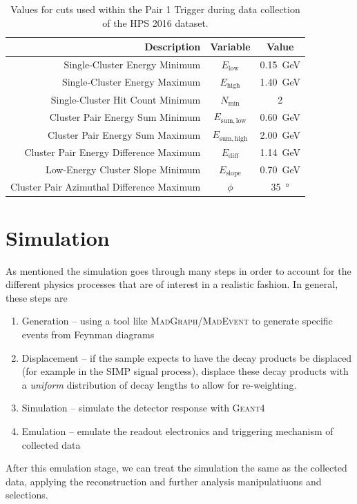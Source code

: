 \begin{table}
  \centering
  \begin{tabular}{|r|c|c|}
    \hline
    Description & Variable & Value \\ \hline
    Single-Cluster Energy Minimum & $E_\mathrm{low}$ & \qty{0.15}{\GeV} \\
    Single-Cluster Energy Maximum & $E_\mathrm{high}$ & \qty{1.40}{\GeV} \\
    Single-Cluster Hit Count Minimum & $N_\mathrm{min}$ & 2 \\
    \hline
    Cluster Pair Energy Sum Minimum & $E_\mathrm{sum,low}$ & \qty{0.60}{\GeV} \\
    Cluster Pair Energy Sum Maximum & $E_\mathrm{sum,high}$ & \qty{2.00}{\GeV} \\
    Cluster Pair Energy Difference Maximum & $E_\mathrm{diff}$ & \qty{1.14}{\GeV} \\
    Low-Energy Cluster Slope Minimum & $E_\mathrm{slope}$ & \qty{0.70}{\GeV} \\
    Cluster Pair Azimuthal Difference Maximum & $\phi$ & \qty{35}{\degree} \\
    \hline
  \end{tabular}
  \caption{Values for cuts used within the Pair 1 Trigger during data collection of the HPS 2016 dataset.}
  \label{tab:pair-1-trigger}
\end{table}


\section{Simulation} \label{sec:hps:sim}
As mentioned the simulation goes through many steps in order to account for the different physics
processes that are of interest in a realistic fashion. In general, these steps are
\begin{enumerate}
  \item Generation -- using a tool like \textsc{MadGraph/MadEvent}\cite{madgraph4-2007,madgraph5-2014}
        to generate specific events from Feynman diagrams
  \item Displacement -- if the sample expects to have the decay products be displaced (for example in the
        SIMP signal process), displace these decay products with a \emph{uniform} distribution of decay
        lengths to allow for re-weighting.
  \item Simulation -- simulate the detector response with \textsc{Geant4}\cite{geant4}
  \item Emulation -- emulate the readout electronics and triggering mechanism of collected data
\end{enumerate}
After this emulation stage, we can treat the simulation the same as the collected data,
applying the reconstruction and further analysis manipulatiuons and selections.

